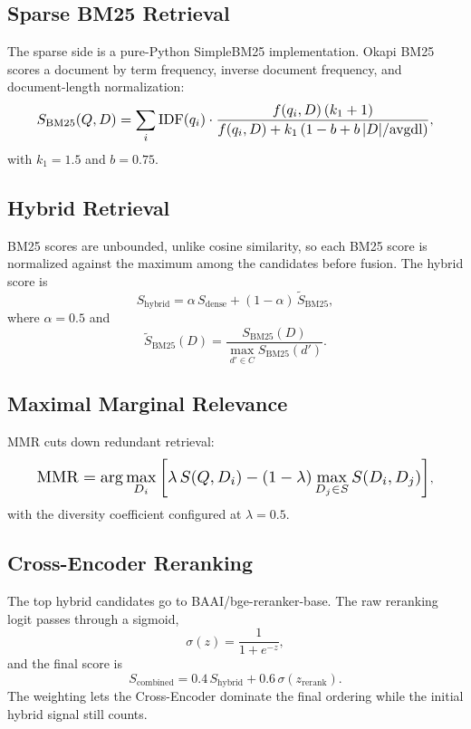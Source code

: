 \documentclass[10pt,twocolumn,letterpaper]{article}
\begin{document}
\subsection{Sparse BM25 Retrieval}
The sparse side is a pure-Python SimpleBM25 implementation. Okapi BM25 scores a document by term frequency, inverse document frequency, and document-length normalization:
\begin{equation}
\resizebox{0.9\columnwidth}{!}{$\displaystyle S_{\mathrm{BM25}}(Q, D) = \sum_i \mathrm{IDF}(q_i) \cdot \frac{f(q_i, D)\,(k_1 + 1)}{f(q_i, D) + k_1\,(1 - b + b\,|D|/\mathrm{avgdl})}$},
\end{equation}
with $k_1 = 1.5$ and $b = 0.75$.

\subsection{Hybrid Retrieval}
BM25 scores are unbounded, unlike cosine similarity, so each BM25 score is normalized against the maximum among the candidates before fusion. The hybrid score is
\begin{equation}
S_{\mathrm{hybrid}} = \alpha\, S_{\mathrm{dense}} + (1 - \alpha)\, \tilde{S}_{\mathrm{BM25}},
\end{equation}
where $\alpha = 0.5$ and
\begin{equation}
\tilde{S}_{\mathrm{BM25}}(D) = \frac{S_{\mathrm{BM25}}(D)}{\max_{d' \in C} S_{\mathrm{BM25}}(d')}.
\end{equation}

\subsection{Maximal Marginal Relevance}
MMR cuts down redundant retrieval:
\begin{equation}
\resizebox{0.9\columnwidth}{!}{$\displaystyle \mathrm{MMR} = \arg\max_{D_i} \left[ \lambda\, S(Q, D_i) - (1 - \lambda) \max_{D_j \in S} S(D_i, D_j) \right]$},
\end{equation}
with the diversity coefficient configured at $\lambda = 0.5$.

\subsection{Cross-Encoder Reranking}
The top hybrid candidates go to BAAI/bge-reranker-base. The raw reranking logit passes through a sigmoid,
\begin{equation}
\sigma(z) = \frac{1}{1 + e^{-z}},
\end{equation}
and the final score is
\begin{equation}
S_{\mathrm{combined}} = 0.4\, S_{\mathrm{hybrid}} + 0.6\, \sigma(z_{\mathrm{rerank}}).
\end{equation}
The weighting lets the Cross-Encoder dominate the final ordering while the initial hybrid signal still counts.
\end{document}
